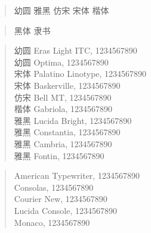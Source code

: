 \documentclass[12pt,a4paper]{article}
\begin{document}
\begin{Large}

\begin{verse}
{\YouYuan 幼圆}
{\YaHei 雅黑}
{\FangSong 仿宋}
{\SimSun 宋体}
{\KaiTi 楷体}
\end{verse}

\begin{verse}
{\HeiTi 黑体}
{\LiShu 隶书}
\end{verse}

\begin{verse}
{\YouYuan 幼圆} {\Eras Eras Light ITC, 1234567890}\\
{\YouYuan 幼圆} {\Optima Optima, 1234567890}\\
{\SimSun 宋体} {\Palatino Palatino Linotype, 1234567890}\\
{\SimSun 宋体} {\Baskerville Baskerville, 1234567890}\\
{\FangSong 仿宋} {\BellMT Bell MT, 1234567890}\\
{\KaiTi 楷体} {\Gabriola Gabriola, 1234567890}\\
{\YaHei 雅黑} {\LucidaBright Lucida Bright, 1234567890}\\
{\YaHei 雅黑} {\Constantia Constantia, 1234567890}\\
{\YaHei 雅黑} {\Cambria Cambria, 1234567890}\\
{\YaHei 雅黑} {\Fontin Fontin, 1234567890}\\
\end{verse}

\begin{verse}
{\Typewriter American Typewriter, 1234567890}\\
{\Consolas Consolas, 1234567890}\\
{\CourierNew Courier New, 1234567890}\\
{\LucidaConsole Lucida Console, 1234567890}\\
{\Monaco Monaco, 1234567890}\\
\end{verse}

\end{Large}
\end{document}
